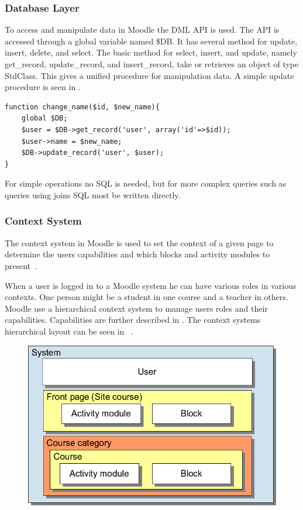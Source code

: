\subsubsection{Database Layer}
\label{sec:moodleoplatformdbml}
To access and manipulate data in Moodle the DML API is used.  The API is accessed through a global variable named \$DB. It has several method for update, insert, delete, and select. 
The basic method for select, insert, and update, namely get\_record, update\_record, and insert\_record, take or retrieves an object of type StdClass. This gives a unified procedure for manipulation data. A simple update procedure is seen in .
\begin{lstlisting}[style=phpCode, caption=\myCaption{Example of how to change the name of an user}, label=moodlecodeupdate]
function change_name($id, $new_name){
	global $DB;
	$user = $DB->get_record('user', array('id'=>$id));
	$user->name = $new_name;
	$DB->update_record('user', $user);
}
\end{lstlisting}
For simple operations no SQL is needed, but for more complex queries such as queries using joins SQL most be written directly. 



\subsubsection{Context System}
\label{sub:contextsystem}
The context system in Moodle is used to set the context of a given page to determine the users capabilities and which blocks and activity modules to present~\cite{moodlerolesandmodules}.
 
When a user is logged in to a Moodle system he can have various roles in various contexts. 
One person might be a student in one course and a teacher in others. 
Moodle use a hierarchical context system to manage users roles and their capabilities. 
Capabilities are further described in . 
The context systems hierarchical layout can be seen in ~\cite{moodlefilemoodlecontext}.
 
 \begin{figure}
	 \centering
		 \includegraphics[width=\textwidth]{images/moodle-contexts.png}
	 \label{fig:moodle-contexts}
 \end{figure}

